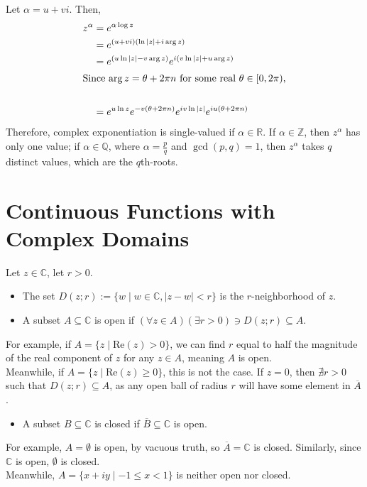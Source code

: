\documentclass[10pt]{extarticle}
\newcommand{\Q}{\mathbb{Q}}
\newcommand{\Z}{\mathbb{Z}}
\newcommand{\R}{\mathbb{R}}
\newcommand{\C}{\mathbb{C}}
\begin{document}
  Let $\alpha = u + vi$. Then,
  \begin{align*}
    z^{\alpha} &= e^{\alpha \log z}\\
               &= e^{(u+vi)(\ln|z| + i\arg z)}\\
               &= e^{(u\ln|z| - v\arg z)}e^{i(v\ln|z| + u\arg z)}\\
   \intertext{Since $\arg z = \theta + 2\pi n$ for some real $\theta\in[0,2\pi)$,}\\
               &= e^{u\ln z} e^{-v(\theta + 2\pi n)} e^{iv\ln|z|} e^{iu(\theta + 2\pi n)}
  \end{align*}
  Therefore, complex exponentiation is single-valued if $\alpha\in \R$. If $\alpha\in \Z$, then $z^{\alpha}$ has only one value; if $\alpha\in \Q$, where $\alpha = \frac{p}{q}$ and $\gcd(p,q) = 1$, then $z^{\alpha}$ takes $q$ distinct values, which are the $q$th-roots.
  \section{Continuous Functions with Complex Domains}%
  Let $z\in \C$, let $r > 0$.
  \begin{itemize}
    \item The set $D(z;r) := \{w\mid w\in\C,|z-w| < r\}$ is the $r$-neighborhood of $z$.
    \item A subset $A\subseteq \C$ is open if $\left(\forall z\in A\right)\left(\exists r > 0\right) \ni D(z;r)\subseteq A$.
  \end{itemize}
  For example, if $A = \{z\mid \text{Re}(z) > 0\}$, we can find $r$ equal to half the magnitude of the real component of $z$ for any $z\in A$, meaning $A$ is open.\\

  Meanwhile, if $A = \{z\mid \text{Re}(z) \geq 0\}$, this is not the case. If $z = 0$, then $\nexists r > 0$ such that $D(z;r)\subseteq A$, as any open ball of radius $r$ will have some element in $\overline{A}$.
  \begin{itemize}
    \item A subset $B\subseteq \C$ is closed if $\overline{B}\subseteq \C$ is open.
  \end{itemize}
  For example, $A = \emptyset$ is open, by vacuous truth, so $\overline{A} = \C$ is closed. Similarly, since $\C$ is open, $\emptyset$ is closed.\\

  Meanwhile, $A = \{x + iy\mid -1\leq x < 1\}$ is neither open nor closed.
\end{document}
